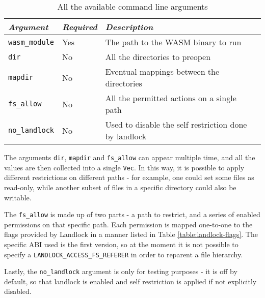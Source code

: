 \begin{table}[h]
  \centering
  \begin{tabular}{|l|l|l|l|}
    \hline
    \textit{Argument} & \textit{Required} & \textit{Description} \\
    \hline\hline
    \texttt{wasm\_module} & Yes & The path to the WASM binary to run \\ \hline
    \texttt{dir} & No & All the directories to preopen \\ \hline
    \texttt{mapdir} & No & Eventual mappings between the directories \\ \hline
    \texttt{fs\_allow} & No & All the permitted actions on a single path \\ \hline
    \texttt{no\_landlock} & No & Used to disable the self restriction done by landlock \\
    \hline
  \end{tabular}
  \caption{All the available command line arguments}
  \label{table:landlock-cli-args}
\end{table}

The arguments \texttt{dir}, \texttt{mapdir} and \texttt{fs\_allow} can appear multiple time, and all the values
are then collected into a single \texttt{Vec}. In this way, it is possible to apply different restrictions on different
paths - for example, one could set some files as read-only, while another subset of files in a specific directory
could also be writable.

The \texttt{fs\_allow} is made up of two parts - a path to restrict, and a series of enabled permissions on that specific path.
Each permission is mapped one-to-one to the flags provided by Landlock in a manner listed in Table \ref*{table:landlock-flags}.
The specific ABI used is the first version, so at the moment it is not possible to specify a \texttt{LANDLOCK\_ACCESS\_FS\_REFERER}
in order to reparent a file hierarchy.

Lastly, the \texttt{no\_landlock} argument is only for testing purposes - it is off by default, so that
landlock is enabled and self restriction is applied if not explicitly disabled.

